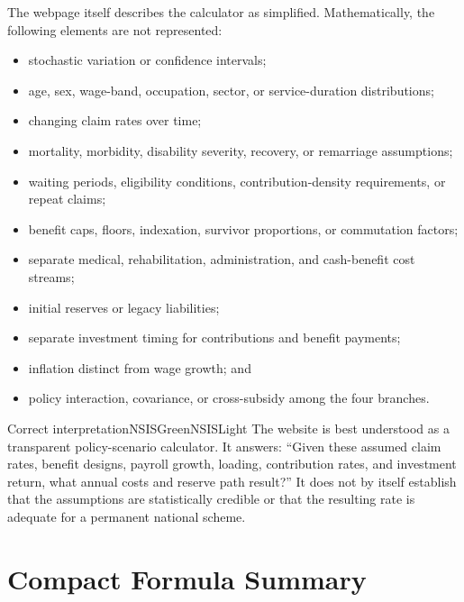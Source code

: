 The webpage itself describes the calculator as simplified. Mathematically, the following elements are not represented:

\begin{itemize}
  \item stochastic variation or confidence intervals;
  \item age, sex, wage-band, occupation, sector, or service-duration distributions;
  \item changing claim rates over time;
  \item mortality, morbidity, disability severity, recovery, or remarriage assumptions;
  \item waiting periods, eligibility conditions, contribution-density requirements, or repeat claims;
  \item benefit caps, floors, indexation, survivor proportions, or commutation factors;
  \item separate medical, rehabilitation, administration, and cash-benefit cost streams;
  \item initial reserves or legacy liabilities;
  \item separate investment timing for contributions and benefit payments;
  \item inflation distinct from wage growth; and
  \item policy interaction, covariance, or cross-subsidy among the four branches.
\end{itemize}

\begin{titledbox}{Correct interpretation}{NSISGreen}{NSISLight}
The website is best understood as a transparent policy-scenario calculator. It answers: ``Given these assumed claim rates, benefit designs, payroll growth, loading, contribution rates, and investment return, what annual costs and reserve path result?'' It does not by itself establish that the assumptions are statistically credible or that the resulting rate is adequate for a permanent national scheme.
\end{titledbox}

\section{Compact Formula Summary}

